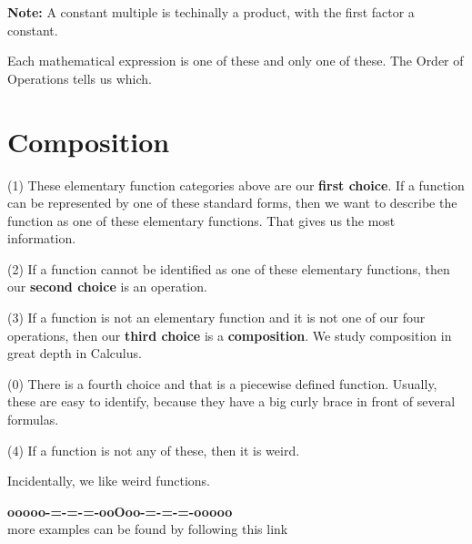 \documentclass{ximera}
\begin{document}
\textbf{Note:} A constant multiple is techinally a product, with the first factor a constant.

Each mathematical expression is one of these and only one of these.  The Order of Operations tells us which.













\section*{Composition}


(1) These elementary function categories above are our \textbf{first choice}.  If a function can be represented by one of these standard forms, then we want to describe the function as one of these elementary functions.  That gives us the most information. 


(2) If a function cannot be identified as one of these elementary functions, then our \textbf{second choice} is an operation. 


(3) If a function is not an elementary function and it is not one of our four operations, then our \textbf{third choice} is a \textbf{\textcolor{purple!85!blue}{composition}}.  We study composition in great depth in Calculus. 

(0) There is a fourth choice and that is a piecewise defined function.  Usually, these are easy to identify, because they have a big curly brace in front of several formulas. 

(4) If a function is not any of these, then it is weird.

Incidentally, we like weird functions.







































\begin{center}
\textbf{\textcolor{green!50!black}{ooooo-=-=-=-ooOoo-=-=-=-ooooo}} \\

more examples can be found by following this link\\ 

\end{center}
\end{document}
